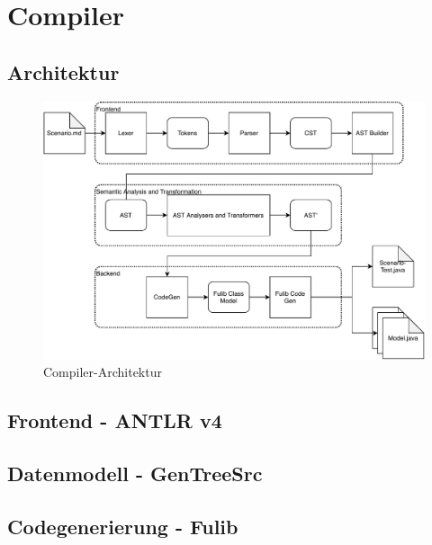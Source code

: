 \section{Compiler}\label{sec:compiler}

\subsection{Architektur}


\begin{figure}
	\includegraphics[width=\textwidth]{chapter/fulib-scenarios/img/architecture.pdf}
	\caption{Compiler-Architektur}
	\label{fig:compiler-architecture}
\end{figure}

\subsection{Frontend - ANTLR v4}\label{subsec:frontend-antlr4}


\subsection{Datenmodell - GenTreeSrc}\label{subsec:data-model-gentreesrc}


\subsection{Codegenerierung - Fulib}\label{subsec:codegen-fulib}

